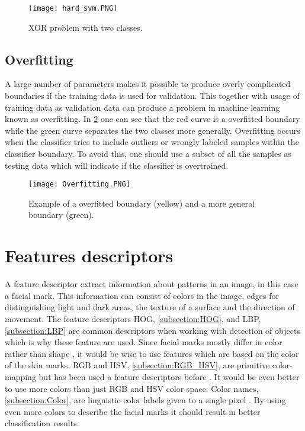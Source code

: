 \FloatBarrier
\begin{figure}[!h]
	\centering
	\texttt{[image: hard\_svm.PNG]}
	\caption{XOR problem with two classes. 
		\label{fig:hard_class}}
\end{figure} 
\FloatBarrier

\subsection{Overfitting}

A large number of parameters makes it possible to produce overly complicated boundaries if the training data is used for validation. This together with usage of training data as validation data can produce a problem in machine learning known as overfitting. In \cref{fig:overfitting} one can see that the red curve is a overfitted boundary while the green curve separates the two classes more generally. Overfitting occurs when the classifier tries to include outliers or wrongly labeled samples within the classifier boundary. To avoid this, one should use a subset of all the samples as testing data which will indicate if the classifier is overtrained. 

\FloatBarrier
\begin{figure}[!h]
	\centering
	\texttt{[image: Overfitting.PNG]}
	\caption{Example of a overfitted boundary (yellow) and a more general boundary (green). 
		\label{fig:overfitting}}
\end{figure} 
\FloatBarrier

\section{Features descriptors} \label{section:features}

A feature descriptor extract information about patterns in an image, in this case a facial mark. This information can consist of colors in the image, edges for distinguishing light and dark areas, the texture of a surface and the direction of movement. The feature descriptors HOG, \cref{subsection:HOG}, and LBP, \cref{subsection:LBP} are common descriptors when working with detection of objects \cite{pedestrian_detection,vehicle_hog,facedetection_LBP} which is why these feature are used. Since facial marks mostly differ in color rather than shape \cite{torso_RPPVSM}, it would be wise to use features which are based on the color of the skin marks. RGB and HSV, \cref{subsection:RGB_HSV}, are primitive color-mapping but has been used a feature descriptors before \cite{torso_RPPVSM}. It would be even better to use more colors than just RGB and HSV color space. Color names, \cref{subsection:Color}, are linguistic color labels given to a single pixel \cite{11_colours}. By using even more colors to describe the facial marks it should result in better classification results. 

